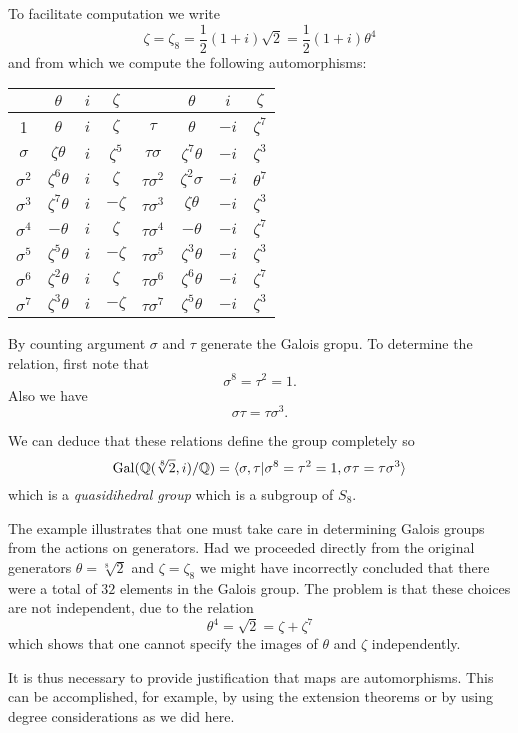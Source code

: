 \documentclass[a4paper]{article}
\begin{document}
\begin{eg}
  To facilitate computation we write
  \[ \zeta = \zeta_8 = \frac{1}{2}(1+i) \sqrt 2 = \frac{1}{2}(1+i) \theta^4 \]
  and from which we compute the following automorphisms:
  \begin{center}
    \begin{tabular}[h]{c c c c||c c c c}
       & $\theta$ & $i$ & $\zeta$ & & $\theta$ & $i$ & $\zeta$ \\
      \hline
      1 & $\theta$ & $i$ & $\zeta$ & $\tau$ & $\theta$ & $-i$ & $\zeta^7$ \\
      \hline
      $\sigma$ & $\zeta\theta$ & $i$ & $\zeta^5$ & $\tau\sigma$ & $\zeta^7 \theta$ & $-i$ & $\zeta^3$ \\
      \hline
      $\sigma^2$ & $\zeta^6\theta$ & $i$ & $\zeta$ & $\tau\sigma^2$ & $\zeta^2\sigma$ & $-i$ & $\theta^7$ \\
      \hline
      $\sigma^3$ & $\zeta^7\theta$ & $i$ & $-\zeta$ & $\tau\sigma^3$ & $\zeta\theta$ & $-i$ & $\zeta^3$ \\
      \hline
      $\sigma^4$ & $-\theta$ & $i$ & $\zeta$ & $\tau\sigma^4$ & $-\theta$ & $-i$ & $\zeta^7$ \\
      \hline
      $\sigma^5$ & $\zeta^5\theta$ & $i$ & $-\zeta$ & $\tau\sigma^5$ & $\zeta^3\theta$ & $-i$ & $\zeta^3$ \\
      \hline
      $\sigma^6$ & $\zeta^2\theta$ & $i$ & $\zeta$ & $\tau\sigma^6$ & $\zeta^6\theta$ & $-i$ & $\zeta^7$ \\
      \hline
      $\sigma^7$ & $\zeta^3\theta$ & $i$ & $-\zeta$ & $\tau\sigma^7$ & $\zeta^5\theta$ & $-i$ & $\zeta^3$ \\
      \hline
    \end{tabular}
  \end{center}

  By counting argument $\sigma$ and $\tau$ generate the Galois gropu. To determine the relation, first note that
  \[ \sigma^8 = \tau^2 = 1.\]
  Also we have
  \[ \sigma\tau = \tau\sigma^3.\]

  We can deduce that these relations define the group completely so
  \[ \gal(\mathbb{Q}(\sqrt[8] 2,i)/\mathbb{Q}) = \langle \sigma, \tau | \sigma^8 = \tau^2 = 1, \sigma\tau = \tau\sigma^3 \rangle\]
  which is a \emph{quasidihedral group} which is a subgroup of $S_8$.
\end{eg}

\begin{remark}
  The example illustrates that one must take care in determining Galois groups from the actions on generators. Had we proceeded directly from the original generators $\theta = \sqrt[8] 2$ and $\zeta = \zeta_8$ we might have incorrectly concluded that there were a total of $32$ elements in the Galois group. The problem is that these choices are not independent, due to the relation
  \[ \theta^4 = \sqrt 2 = \zeta + \zeta^7 \]
  which shows that one cannot specify the images of $\theta$ and $\zeta$ independently.

  It is thus necessary to provide justification that maps are automorphisms. This can be accomplished, for example, by using the extension theorems or by using degree considerations as we did here.
\end{remark}
\end{document}
